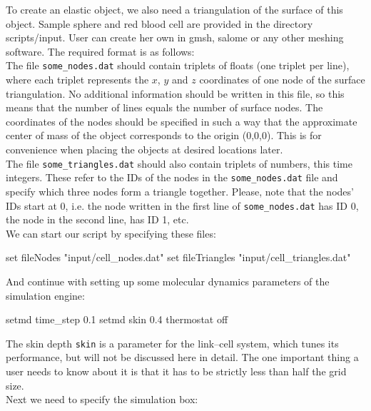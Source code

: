 \documentclass[
a4paper,                        %
11pt,                           %
twoside,                        %
footsepline,                    %
headsepline,                    %
headexclude,                    %
footexclude,                    %
pagesize,                       %
]{scrartcl}
\begin{document}
To create an elastic object, we also need a triangulation of the surface of this object. Sample sphere and red blood cell are provided in the directory scripts/input. User can create her own in gmsh, salome or any other meshing software. The required format is as follows:\\

The file \verb|some_nodes.dat| should contain triplets of floats (one triplet per line), where each triplet represents the $x$, $y$ and $z$ coordinates of one node of the surface triangulation. No additional information should be written in this file, so this means that the number of lines equals the number of surface nodes. The coordinates of the nodes should be specified in such a way that the approximate center of mass of the object corresponds to the origin (0,0,0). This is for convenience when placing the objects at desired locations later.\\

The file \verb|some_triangles.dat| should also contain triplets of numbers, this time integers. These refer to the IDs of the nodes in the \verb|some_nodes.dat| file and specify which three nodes form a triangle together. Please, note that the nodes' IDs start at 0, i.e. the node written in the first line of \verb|some_nodes.dat| has ID 0, the node in the second line, has ID 1, etc.\\     

We can start our script by specifying these files:\\
\begin{tclcode}
  set fileNodes  "input/cell_nodes.dat"
  set fileTriangles "input/cell_triangles.dat"
\end{tclcode}
\vspace{0 mm}

And continue with setting up some molecular dynamics parameters of the simulation engine:\\
\begin{tclcode}
  setmd time_step 0.1    
  setmd skin 0.4
  thermostat off
\end{tclcode}
\vspace{0 mm}

The skin depth \verb|skin| is a parameter for the link--cell system, which tunes its performance, but will not be discussed here in detail. The one important thing a user needs to know about it is that it has to be strictly less than half the grid size.\\

Next we need to specify the simulation box:\\
\vspace{0 mm}
\end{document}
